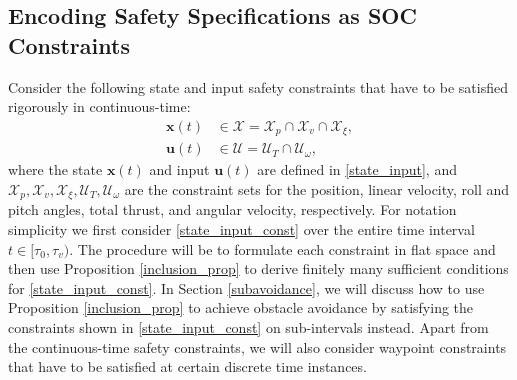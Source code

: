 \documentclass[journal,10pt]{IEEEtran}
\newtheorem{remark}{\bfseries Remark}
\newcommand{\vect}[1]{\boldsymbol{\mathbf{#1}}}
\begin{document}
\subsection{Encoding Safety Specifications as SOC Constraints}
Consider the following state and input safety constraints that have to be satisfied rigorously in continuous-time:
\begin{subequations} \label{state_input_const}
\begin{align}
  \vect{x}(t) &\in\mathcal{X} = \mathcal{X}_{p} \cap \mathcal{X}_{v} \cap\mathcal{X}_{\xi},\\
  \vect{u}(t) &\in \mathcal{U} = \mathcal{U}_T\cap\mathcal{U}_{\omega},
\end{align}
\end{subequations}
where the state $\vect{x}(t)$ and input $\vect{u}(t)$ are defined in \eqref{state_input}, and $\mathcal{X}_{p},\mathcal{X}_{v},\mathcal{X}_{\xi},\mathcal{U}_T,\mathcal{U}_{\omega}$ are the constraint sets for the position, linear velocity, roll and pitch angles, total thrust, and angular velocity, respectively. For notation simplicity we first consider \eqref{state_input_const} over the entire time interval $t\in[\tau_0,\tau_v)$. The procedure will be to formulate each constraint in flat space and then use Proposition \ref{inclusion_prop} to derive finitely many sufficient conditions for \eqref{state_input_const}. In Section \ref{subavoidance}, we will discuss how to use Proposition \ref{inclusion_prop} to achieve obstacle avoidance by satisfying the constraints shown in \eqref{state_input_const} on sub-intervals instead. Apart from the continuous-time safety constraints, we will also consider waypoint constraints that have to be satisfied at certain discrete time instances.






\end{document}
